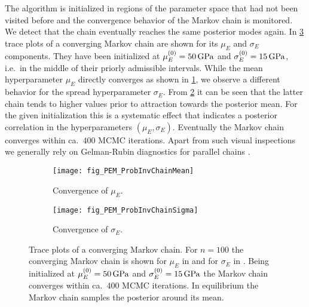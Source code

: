 The algorithm is initialized in regions of the parameter space that had not been visited before and the convergence behavior of the Markov chain is monitored.
We detect that the chain eventually reaches the same posterior modes again.
In \cref{fig:PEM:ProbInv:Chains} trace plots of a converging Markov chain are shown for its \(\mu_E\) and \(\sigma_E\) components.
They have been initialized at \(\mu_E^{(0)}=\unit[50]{GPa}\) and \(\sigma_E^{(0)}=\unit[15]{GPa}\), i.e.\ in the middle of their priorly admissible intervals.
While the mean hyperparameter \(\mu_E\) directly converges as shown in \cref{fig:PEM:ProbInv:Chain:Mean}, we observe a different behavior for the spread hyperparameter \(\sigma_E\).
From \cref{fig:PEM:ProbInv:Chain:Sigma} it can be seen that the latter chain tends to higher values prior to attraction towards the posterior mean.
For the given initialization this is a systematic effect that indicates a posterior correlation in the hyperparameters \((\mu_E,\sigma_E)\).
Eventually the Markov chain converges within ca.\ \(400\) MCMC iterations.
Apart from such visual inspections we generally rely on Gelman-Rubin diagnostics for parallel chains \cite{MCMC:Gelman1992,MCMC:Brooks1998:Gelman}.
\begin{figure}[ht]
  \centering
  \begin{subfigure}[b]{0.5\textwidth}
    \centering
    \texttt{[image: fig\_PEM\_ProbInvChainMean]}
    \caption{Convergence of \(\mu_E\).}
    \label{fig:PEM:ProbInv:Chain:Mean}
  \end{subfigure}%
  \begin{subfigure}[b]{0.5\textwidth}
    \centering
    \texttt{[image: fig\_PEM\_ProbInvChainSigma]}
    \caption{Convergence of \(\sigma_E\).}
    \label{fig:PEM:ProbInv:Chain:Sigma}
  \end{subfigure}%
  \caption[Trace plots of a converging Markov chain]{Trace plots of a converging Markov chain.
           For \(n=100\) the converging Markov chain is shown for \(\mu_E\) in  and for \(\sigma_E\) in .
           Being initialized at \(\mu_E^{(0)}=\unit[50]{GPa}\) and \(\sigma_E^{(0)}=\unit[15]{GPa}\) the Markov chain converges within ca.\ \(400\) MCMC iterations.
           In equilibrium the Markov chain samples the posterior around its mean.
           }
  \label{fig:PEM:ProbInv:Chains}
\end{figure}
